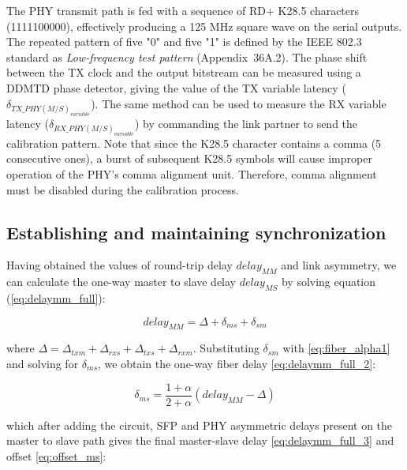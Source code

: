 The PHY transmit path is fed with a sequence of RD+ K28.5 characters (1111100000),
effectively producing a 125 MHz square wave on the serial outputs. 
The repeated pattern of five "0" and five "1" is defined by the IEEE 802.3 standard \cite{IEEE802.3} 
as \textit{Low-frequency test pattern} (Appendix~36A.2). The phase
shift between the TX clock and the output bitstream can be measured using
a DDMTD phase detector, giving the value of the TX variable latency 
($\delta_{TX\_PHY(M/S)_{variable}}$). The same method
can be used to measure the RX variable latency ($\delta_{RX\_PHY(M/S)_{variable}}$) 
by commanding the link partner to send
the calibration pattern. Note that since the K28.5 character contains a comma
(5 consecutive ones), a burst of subsequent K28.5 symbols will cause improper
operation of the PHY's comma alignment unit. Therefore, comma alignment must
be disabled during the calibration process.

\subsection{Establishing and maintaining synchronization}
\label{s:estab_sync}
Having obtained the values of round-trip delay $delay_{MM}$ and link asymmetry,
we can calculate the one-way master to slave delay $delay_{MS}$ by solving
equation (\ref{eq:delaymm_full}):

\begin{equation}
delay_{MM} = \Delta + \delta_{ms} + \delta_{sm}
\label{eq:delaymm_full}
\end{equation}

where $\Delta = \Delta_{txm} + \Delta_{rxs} + \Delta_{txs} +
\Delta_{rxm}$. Substituting $\delta_{sm}$ with \ref{eq:fiber_alpha1}
and solving for $\delta_{ms}$, we obtain the one-way fiber delay
\ref{eq:delaymm_full_2}:

\begin{equation}
\delta_{ms} = \frac{1+\alpha}{2+\alpha} (delay_{MM} - \Delta)
\label{eq:delaymm_full_2}
\end{equation}

which after adding the circuit, SFP and PHY asymmetric delays present on the
master to slave path gives the final master-slave delay \ref{eq:delaymm_full_3}
and offset \ref{eq:offset_ms}:

